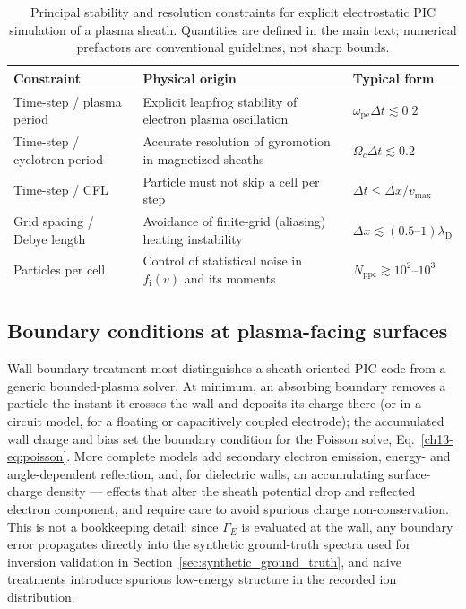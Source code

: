 \begin{table}[htbp]
\centering
\caption{Principal stability and resolution constraints for explicit electrostatic PIC simulation of a plasma sheath. Quantities are defined in the main text; numerical prefactors are conventional guidelines, not sharp bounds.}
\label{tab:pic_stability}
\begin{tabularx}{\linewidth}{@{}l X l@{}}
\toprule
Constraint & Physical origin & Typical form \\
\midrule
Time-step / plasma period & Explicit leapfrog stability of electron plasma oscillation & $\omega_{\mathrm{pe}}\Delta t \lesssim 0.2$ \\
Time-step / cyclotron period & Accurate resolution of gyromotion in magnetized sheaths & $\Omega_{c}\Delta t \lesssim 0.2$ \\
Time-step / CFL & Particle must not skip a cell per step & $\Delta t \le \Delta x / v_{\max}$ \\
Grid spacing / Debye length & Avoidance of finite-grid (aliasing) heating instability & $\Delta x \lesssim (0.5\text{--}1)\lambda_{\mathrm{D}}$ \\
Particles per cell & Control of statistical noise in $f_{\mathrm{i}}(v)$ and its moments & $N_{\mathrm{ppc}} \gtrsim 10^{2}\text{--}10^{3}$ \\
\bottomrule
\end{tabularx}
\end{table}

\subsection{Boundary conditions at plasma-facing surfaces}

Wall-boundary treatment most distinguishes a sheath-oriented PIC code from a generic bounded-plasma solver. At minimum, an absorbing boundary removes a particle the instant it crosses the wall and deposits its charge there (or in a circuit model, for a floating or capacitively coupled electrode); the accumulated wall charge and bias set the boundary condition for the Poisson solve, Eq.~\eqref{ch13-eq:poisson}. More complete models add secondary electron emission, energy- and angle-dependent reflection, and, for dielectric walls, an accumulating surface-charge density --- effects that alter the sheath potential drop and reflected electron component, and require care to avoid spurious charge non-conservation. This is not a bookkeeping detail: since $\Gamma_{E}$ is evaluated at the wall, any boundary error propagates directly into the synthetic ground-truth spectra used for inversion validation in Section~\ref{sec:synthetic_ground_truth}, and naive treatments introduce spurious low-energy structure in the recorded ion distribution.

